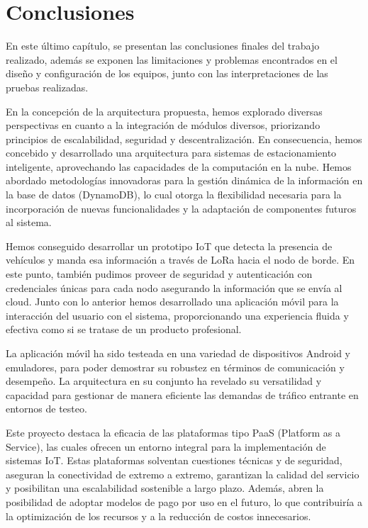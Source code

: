 \clearpage
\section{Conclusiones}
En este último capítulo, se presentan las conclusiones finales del trabajo realizado, además se exponen las limitaciones y problemas encontrados en el diseño y configuración de los equipos, junto con las interpretaciones de las pruebas realizadas.

En la concepción de la arquitectura propuesta, hemos explorado diversas perspectivas en cuanto a la integración de módulos diversos, priorizando principios de escalabilidad, seguridad y descentralización. En consecuencia, hemos concebido y desarrollado una arquitectura para sistemas de estacionamiento inteligente, aprovechando las capacidades de la computación en la nube. Hemos abordado metodologías innovadoras para la gestión dinámica de la información en la base de datos (DynamoDB), lo cual otorga la flexibilidad necesaria para la incorporación de nuevas funcionalidades y la adaptación de componentes futuros al sistema.

Hemos conseguido desarrollar un prototipo IoT que detecta la presencia de vehículos y manda esa información a través de LoRa hacia el nodo de borde. En este punto, también pudimos proveer de seguridad y autenticación con credenciales únicas para cada nodo asegurando la información que se envía al cloud. Junto con lo anterior hemos desarrollado una aplicación móvil para la interacción del usuario con el sistema, proporcionando una experiencia fluida y efectiva como si se tratase de un producto profesional.

La aplicación móvil ha sido testeada en una variedad de dispositivos Android y emuladores, para poder demostrar su robustez en términos de comunicación y desempeño. La arquitectura en su conjunto ha revelado su versatilidad y capacidad para gestionar de manera eficiente las demandas de tráfico entrante en entornos de testeo.

Este proyecto destaca la eficacia de las plataformas tipo PaaS (Platform as a Service), las cuales ofrecen un entorno integral para la implementación de sistemas IoT. Estas plataformas solventan cuestiones técnicas y de seguridad, aseguran la conectividad de extremo a extremo, garantizan la calidad del servicio y posibilitan una escalabilidad sostenible a largo plazo. Además, abren la posibilidad de adoptar modelos de pago por uso en el futuro, lo que contribuiría a la optimización de los recursos y a la reducción de costos innecesarios.

